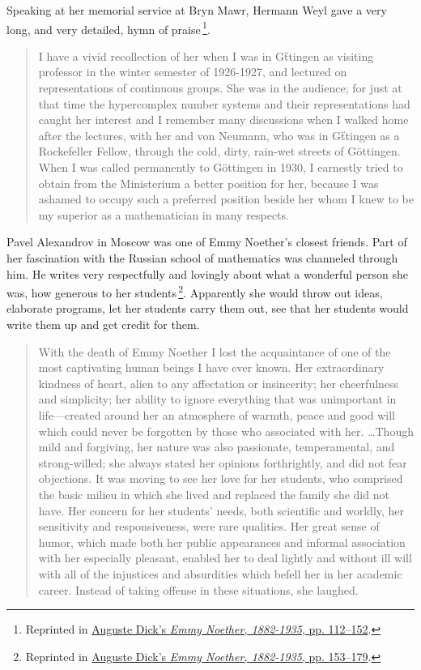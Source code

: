 \documentclass[twoside,symmetric]{tufte-handout}
\begin{document}
Speaking at her memorial service at Bryn Mawr, Hermann Weyl gave a very long, and very detailed, hymn of praise$\,$\footnote{Reprinted in \hyperref[auguste]{Auguste Dick's \emph{Emmy Noether, 1882-1935}, pp. 112--152}.}.
\begin{quote}
I have a vivid recollection of her when I was in G\"ttingen as visiting professor in the winter semester of 1926-1927, and lectured on representations of continuous groups. She was in the audience; for just at that time the hypercomplex number systems and their representations had caught her interest and I remember many discussions when I walked home after the lectures, with her and von Neumann, who was in G\"ttingen as a Rockefeller Fellow, through the cold, dirty, rain-wet streets of G\"ottingen. When I was called permanently to G\"ottingen in 1930, I earnestly tried to obtain from the Ministerium a better position for her, because I was ashamed to occupy such a preferred position beside her whom I knew to be my superior as a mathematician in many respects.
\end{quote}

Pavel Alexandrov in Moscow was one of Emmy Noether's closest friends. Part of her fascination with the Russian school of mathematics was channeled through him. He writes very respectfully and lovingly about what a wonderful person she was, how generous to her students$\,$\footnote{Reprinted in \hyperref[auguste]{Auguste Dick's \emph{Emmy Noether, 1882-1935}, pp. 153--179}.}. Apparently she would throw out ideas, elaborate programs, let her students carry them out, see that her students would write them up and get credit for them.
\begin{quote}
With the death of Emmy Noether I lost the acquaintance of one of the most captivating human beings I have ever known. Her extraordinary kindness of heart, alien to any affectation or insincerity; her cheerfulness and simplicity; her ability to ignore everything that was unimportant in life---created around her an atmosphere of warmth, peace and good will which could never be forgotten by those who associated with her.  \ldots Though mild and forgiving, her nature was also passionate, temperamental, and strong-willed; she always stated her opinions forthrightly, and did not fear objections. It was moving to see her love for her students, who comprised the basic milieu in which she lived and replaced the family she did not have. Her concern for her students' needs, both scientific and worldly, her sensitivity and responsiveness, were rare qualities. Her great sense of humor, which made both her public appearances and informal association with her especially pleasant, enabled her to deal lightly and without ill will with all of the injustices and absurdities which befell her in her academic career. Instead of taking offense in these situations, she laughed.
\end{quote}
\end{document}
